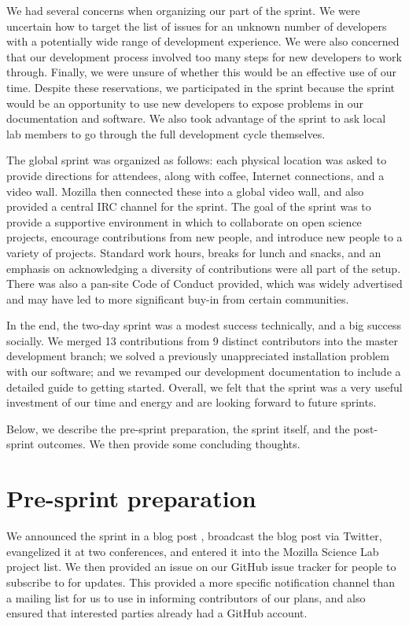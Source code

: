 \documentclass[11pt]{article}
\begin{document}
We had several concerns when organizing our part of the sprint.  We
were uncertain how to target the list of issues for an unknown number
of developers with a potentially wide range of development experience.
We were also concerned that our development process involved too many
steps for new developers to work through.  Finally, we were unsure of
whether this would be an effective use of our time.  Despite these
reservations, we participated in the sprint because the sprint would
be an opportunity to use new developers to expose problems in our
documentation and software.  We also took advantage of the sprint to
ask local lab members to go through the full development cycle
themselves.

The global sprint was organized as follows: each physical location was
asked to provide directions for attendees, along with coffee, Internet
connections, and a video wall.  Mozilla then connected these into a
global video wall, and also provided a central IRC channel for the
sprint.  The goal of the sprint was to provide a supportive
environment in which to collaborate on open science projects,
encourage contributions from new people, and introduce new people to a
variety of projects.  Standard work hours, breaks for lunch and
snacks, and an emphasis on acknowledging a diversity of contributions
were all part of the setup.  There was also a pan-site Code of Conduct
provided, which was widely advertised and may have led to more
significant buy-in from certain communities.

In the end, the two-day sprint was a modest success technically, and a
big success socially. We merged 13 contributions from 9 distinct
contributors into the master development branch; we solved a
previously unappreciated installation problem with our software; and
we revamped our development documentation to include a detailed guide
to getting started.  Overall, we felt that the sprint was a very
useful investment of our time and energy and are looking forward to
future sprints.

Below, we describe the pre-sprint preparation, the sprint itself, and the
post-sprint outcomes.  We then provide some concluding thoughts.

\section{Pre-sprint preparation}

We announced the sprint in a blog post \cite{bogpost}, broadcast the
blog post via Twitter, evangelized it at two conferences, and entered
it into the Mozilla Science Lab project list.  We then provided an
issue on our GitHub issue tracker for people to subscribe to for
updates.  This provided a more specific notification channel than a
mailing list for us to use in informing contributors of our plans, and
also ensured that interested parties already had a GitHub account.
\end{document}
